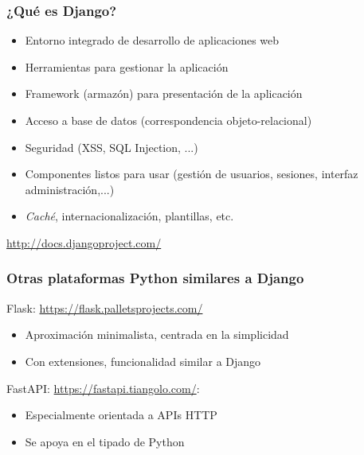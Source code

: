 \begin{frame}
\frametitle{¿Qué es Django?}

\begin{itemize}
\item Entorno integrado de desarrollo de aplicaciones web
\item Herramientas para gestionar la aplicación
\item Framework (armazón) para presentación de la aplicación
\item Acceso a base de datos (correspondencia objeto-relacional)
\item Seguridad (XSS, SQL Injection, ...)
\item Componentes listos para usar (gestión de usuarios, sesiones, interfaz administración,...)
\item \emph{Caché}, internacionalización, plantillas, etc.
\end{itemize}

\begin{flushright}
\url{http://docs.djangoproject.com/}
\end{flushright}
\end{frame}

\begin{frame}
\frametitle{Otras plataformas Python similares a Django}

Flask: \url{https://flask.palletsprojects.com/}
\begin{itemize}
\item Aproximación minimalista, centrada en la simplicidad
\item Con extensiones, funcionalidad similar a Django
\end{itemize}

\vspace{0.5cm}

FastAPI: \url{https://fastapi.tiangolo.com/}:

\begin{itemize}
\item Especialmente orientada a APIs HTTP
\item Se apoya en el tipado de Python
\end{itemize}

\end{frame}

